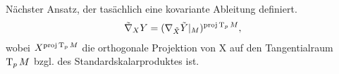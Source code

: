 \begin{bsp}
\begin{enumerate}[label=\arabic*),leftmargin=*]
	Nächster Ansatz, der tasächlich eine kovariante Ableitung definiert.
	\begin{align*}
		\tilde \nabla_XY = (\nabla_{\tilde X}\tilde Y|_M)^{\text{proj}\operatorname{T}_pM},
	\end{align*}
	wobei $X^{\text{proj}\operatorname{T}_pM}$ die orthogonale Projektion von X auf den Tangentialraum $\operatorname{T}_pM$ bzgl. des Standardskalarproduktes ist.

\end{enumerate}\end{bsp}

